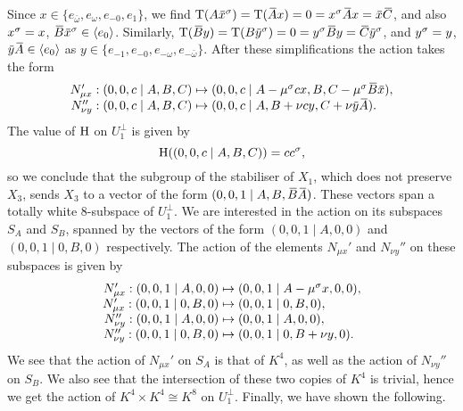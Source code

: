 Since $x \in \{e_{\bar{\omega}}, e_{\omega}, e_{-0}, e_1\}$, we find $\Tr(A\ovx^{\s}) = 
\Tr(\ovA x) = 0 = x^{\s} \ovA x = \ovx \ovC$, and also $x^{\sigma} = x$, $\ovB \ovx^{\s} \in 
\langle e_0 \rangle$. Similarly, $\Tr(\ovB y) = \Tr(B\ovy^{\s}) = 0 = y^{\s} \ovB y = \ovC \ovy^{\s}$,
and $y^{\sigma} = y$, $\ovy \ovA \in \langle e_0 \rangle$ as $y \in \{ e_{-1}, e_{-0}, e_{-\omega}, 
e_{-\bar{\omega}} \}$. After these simplifications the action takes the form
\begin{equation}
	\begin{array}{r@{\;}c@{\;}l}
		N_{\mu x}' : (0,0,c\mid A,B,C) & \mapsto &
			(0,0,c\mid A  - \mu^{\s} c x, B, C - \mu^{\s}\ovB\ovx ), \\
		
		N_{\nu y}'' : (0,0,c\mid A,B,C) & \mapsto &
			(0,0,c\mid A, B + \nu c y, C + \nu \ovy \ovA).
	\end{array}
\end{equation}
The value of $\mathrm{H}$ on $U_1^{\perp}$ is given by
\begin{equation}
	\mathrm{H}((0,0,c\mid A,B,C)) = c c^{\sigma},
\end{equation}
so we conclude that the subgroup of the stabiliser of $X_1$, which does not preserve $X_3$, 
sends $X_3$ to a vector of the form $(0,0,1\mid A,B, \ovB \ovA)$. These vectors span a 
totally white $8$-subspace of $U_1^{\perp}$. We are interested in the action on its subspaces
$S_A$ and $S_B$, spanned by the vectors of the form $(0,0,1\mid A,0,0)$ and 
$(0,0,1\mid 0,B,0)$ respectively. The action of the elements $N_{\mu x}'$ and $N_{\nu y}''$ 
on these subspaces is given by
\begin{equation}
	\begin{array}{r@{\;}c@{\;}l}
		N_{\mu x}' : (0,0,1\mid A,0,0) & \mapsto & 
			(0,0,1\mid A -\mu^{\s} x , 0, 0), \\
			
		N_{\mu x}' : (0,0,1\mid 0,B,0) & \mapsto &
			(0,0,1\mid 0,B,0), \\
			
		N_{\nu y}'' : (0,0,1\mid A,0,0) & \mapsto &
			(0,0,1\mid A,0,0), \\
			
		N_{\nu y}'' : (0,0,1\mid 0,B,0) & \mapsto &
			(0,0,1\mid 0,B + \nu y, 0).
	\end{array}
\end{equation}
We see that the action of $N_{\mu x}'$ on $S_A$ is that of $K^4$, as well as the action
of $N_{\nu y}''$ on $S_B$. We also see that the intersection of these two copies of $K^4$
is trivial, hence we get the action of $K^4 \times K^4 \cong K^8$ on $U_1^{\perp}$. 
Finally, we have shown the following.


